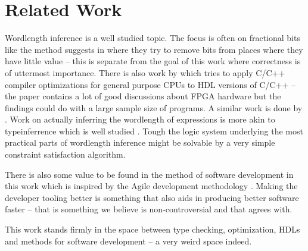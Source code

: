 \chapter{Related Work}
Wordlength inference is a well studied topic. The focus is often on fractional bits like the method \citeauthor{src:MinOfFrac} suggests in \cite{src:MinOfFrac} where they try to remove bits from places where they have little value -- this is separate from the goal of this work where correctness is of uttermost importance. There is also work \cite{src:HLSandOpt} by \citeauthor{src:HLSandOpt} which tries to apply C/C++ compiler optimizations for general purpose CPUs to HDL versions of C/C++ -- the paper contains a lot of good discussions about FPGA hardware but the findings could do with a large sample size of programs. A similar work is done by \citeauthor{src:ConFPGA}. Work on actually inferring the wordlength of expressions is more akin to typeinferrence which is well studied \cite{src:DamasHindleyMilner}\cite{src:TypeCheckersBook}\cite{src:BiTy}. Tough the logic system underlying the most practical parts of wordlength inference might be solvable by a very simple constraint satisfaction algorithm.

There is also some value to be found in the method of software development in this work which is inspired by the Agile development methodology \cite{src:Agile}. Making the developer tooling better is something that also aids in producing better software faster -- that is something we believe is non-controversial and that \cite{src:Agile} agrees with.

This work stands firmly in the space between type checking, optimization, HDLs and methods for software development -- a very weird space indeed.
